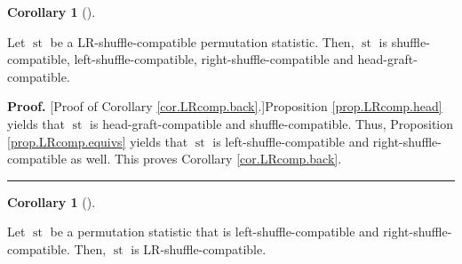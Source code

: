 \documentclass[numbers=enddot,12pt,final,onecolumn,notitlepage]{scrartcl}%
\theoremstyle{definition}
\newtheorem{coro}[theo]{Corollary}
\newenvironment{corollary}[1][]
{\begin{coro}[#1]\begin{leftbar}}
{\end{leftbar}\end{coro}}
\newenvironment{proof}[1][Proof]{\noindent\textbf{#1.} }{\ \rule{0.5em}{0.5em}}
\newenvironment{verlong}{}{}
\begin{document}
\begin{corollary}
\label{cor.LRcomp.back}Let $\operatorname{st}$ be a LR-shuffle-compatible
permutation statistic. Then, $\operatorname{st}$ is shuffle-compatible,
left-shuffle-compatible, right-shuffle-compatible and head-graft-compatible.
\end{corollary}

\begin{verlong}
\begin{proof}
[Proof of Corollary \ref{cor.LRcomp.back}.]Proposition \ref{prop.LRcomp.head}
yields that $\operatorname{st}$ is head-graft-compatible and
shuffle-compatible. Thus, Proposition \ref{prop.LRcomp.equivs} yields that
$\operatorname{st}$ is left-shuffle-compatible and right-shuffle-compatible
as well. This proves Corollary \ref{cor.LRcomp.back}.
\end{proof}
\end{verlong}

\begin{corollary}
\label{cor.LRcomp.two}Let $\operatorname{st}$ be a permutation statistic that
is left-shuffle-compatible and right-shuffle-compatible. Then,
$\operatorname{st}$ is LR-shuffle-compatible.
\end{corollary}
\end{document}

